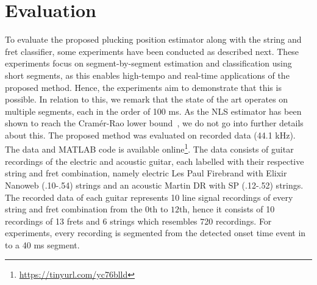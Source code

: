 \documentclass{article}
\begin{document}
\section{Evaluation} %
\label{sec:experiments}
To evaluate the proposed plucking position estimator along with the string and fret classifier, some experiments have been conducted as described next. These experiments focus on segment-by-segment estimation and classification using short segments, as this enables high-tempo and real-time applications of the proposed method. Hence, the experiments aim to demonstrate that this is possible. In relation to this, we remark that the state of the art \cite{barbancho:inharmonicity_tablature,michelson2018_aes} operates on multiple segments, each in the order of 100 ms. As the NLS estimator has been shown to reach the Cram{\'e}r-Rao lower bound~\cite{nielsen2017fast}, we do not go into further details about this. The proposed method was evaluated on recorded data (44.1 kHz). The data and MATLAB code is available online\footnote{\url{https://tinyurl.com/yc76blld}}. The data consists of guitar recordings of the electric and acoustic guitar, each labelled with their respective string and fret combination, namely electric Les Paul Firebrand with Elixir Nanoweb (.10-.54) strings and an acoustic Martin DR with SP (.12-.52) strings. The recorded data of each guitar represents 10 line signal recordings of every string and fret combination from the $0$th to $12$th, hence it consists of 10 recordings of 13 frets and 6 strings which resembles 720 recordings. For experiments, every recording is segmented from the detected onset time event in to a 40 ms segment. %
%
%
%
%
%
%
\end{document}
